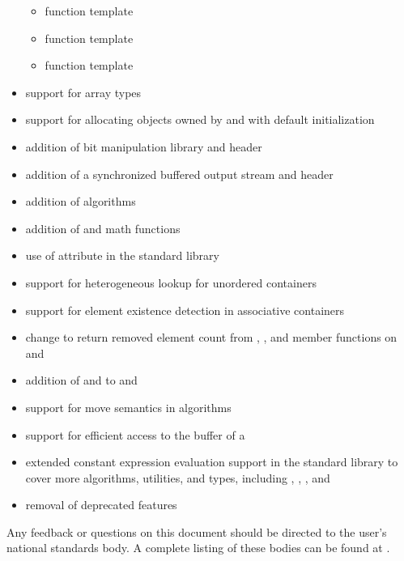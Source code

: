 \begin{itemize}
\begin{itemize}
  \item function template 
  \item function template 
  \item function template 
\end{itemize}
\item {} support for array types
\item support for allocating objects owned by  and 
with default initialization
\item addition of bit manipulation library and  header
\item addition of a synchronized buffered output stream and  header
\item addition of  algorithms
\item addition of  and  math functions
\item use of \tcode{[[nodiscard]]} attribute in the standard library
\item support for heterogeneous lookup for unordered containers
\item support for element existence detection in associative containers
\item change to return removed element count
from , , and 
member functions on  and 
\item addition of  and 
to  and 
\item support for move semantics in  algorithms
\item support for efficient access to the buffer of a 
\item extended constant expression evaluation support in the standard library
to cover more algorithms, utilities, and types, including
, , , and 
\item removal of deprecated features
\end{itemize}

Any feedback or questions on this document
should be directed to the user's national standards body.
A complete listing of these bodies can be found at
\href{http://www.iso.org/members.html}{}.
